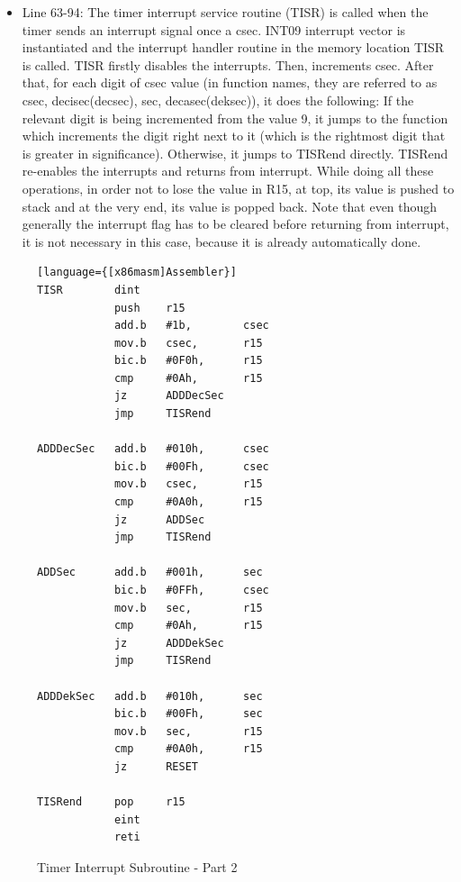 \documentclass[pdftex,12pt,a4paper]{article}
\begin{document}
\begin{itemize}
    \item Line 63-94: The timer interrupt service routine (TISR) is called when the timer sends an interrupt signal once a csec. INT09 interrupt vector is instantiated and the interrupt handler routine in the memory location TISR is called. TISR firstly disables the interrupts. Then, increments csec. After that, for each digit of csec value (in function names, they are referred to as csec, decisec(decsec), sec, decasec(deksec)), it does the following:
    \newline
    If the relevant digit is being incremented from the value 9, it jumps to the function which increments the digit right next to it (which is the rightmost digit that is greater in significance). Otherwise, it jumps to TISRend directly. TISRend re-enables the interrupts and returns from interrupt.
    \newline
    While doing all these operations, in order not to lose the value in R15, at top, its value is pushed to stack and at the very end, its value is popped back.
    \newline
    Note that even though generally the interrupt flag has to be cleared before returning from interrupt, it is not necessary in this case, because it is already automatically done.
    
\end{itemize}

\begin{figure}[H]
    \centering
    \begin{lstlisting}[firstnumber=63][language={[x86masm]Assembler}]
TISR		dint
			push	r15
			add.b	#1b,		csec
			mov.b	csec,		r15
			bic.b	#0F0h,		r15
			cmp		#0Ah,		r15
			jz		ADDDecSec
			jmp		TISRend

ADDDecSec	add.b	#010h,		csec
			bic.b	#00Fh,		csec
			mov.b	csec,		r15
			cmp		#0A0h,		r15
			jz		ADDSec
			jmp		TISRend

ADDSec		add.b	#001h,		sec
			bic.b	#0FFh,		csec
			mov.b	sec,		r15
			cmp		#0Ah,		r15
			jz		ADDDekSec
			jmp		TISRend

ADDDekSec	add.b	#010h,		sec
			bic.b	#00Fh,		sec
			mov.b	sec,		r15
			cmp		#0A0h,		r15
			jz		RESET

TISRend		pop 	r15
			eint
			reti

    \end{lstlisting}
    \label{code:part1delay}
    \caption{Timer Interrupt Subroutine - Part 2}
\end{figure}
\end{document}
